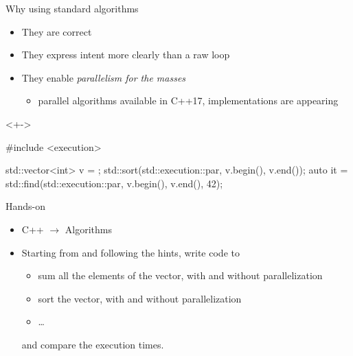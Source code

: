 \begin{frame}[fragile]{Why using standard algorithms}

  \begin{itemize}[<+->]
  \item They are correct
  \item They express intent more clearly than a raw  loop
  \item They enable \textit{parallelism for the masses}
    \begin{itemize}[<.->]
    \item parallel algorithms available in C++17, implementations are appearing
    \end{itemize}
  \end{itemize}

  \begin{codeblock}<+->{
#include <execution>

std::vector<int> v = \ddd;
std::sort(\alert{std::execution::par}, v.begin(), v.end());
auto it = std::find(\alert{std::execution::par}, v.begin(), v.end(), 42);}\end{codeblock}

\end{frame}

\begin{frame}{Hands-on}
  \begin{itemize}
  \item C++ $\rightarrow$ Algorithms
  \item Starting from  and following the hints, write code to
    \begin{itemize}
    \item sum all the elements of the vector, with and without parallelization
    \item sort the vector, with and without parallelization
    \item \ldots
    \end{itemize}
    and compare the execution times.
  \end{itemize}
\end{frame}

